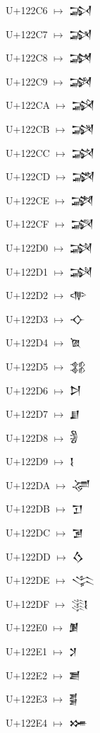 {\noindent U+122C6  $\mapsto$ {\cufont 𒋆}\par
\noindent U+122C7  $\mapsto$ {\cufont 𒋇}\par
\noindent U+122C8  $\mapsto$ {\cufont 𒋈}\par
\noindent U+122C9  $\mapsto$ {\cufont 𒋉}\par
\noindent U+122CA  $\mapsto$ {\cufont 𒋊}\par
\noindent U+122CB  $\mapsto$ {\cufont 𒋋}\par
\noindent U+122CC  $\mapsto$ {\cufont 𒋌}\par
\noindent U+122CD  $\mapsto$ {\cufont 𒋍}\par
\noindent U+122CE  $\mapsto$ {\cufont 𒋎}\par
\noindent U+122CF  $\mapsto$ {\cufont 𒋏}\par
\noindent U+122D0  $\mapsto$ {\cufont 𒋐}\par
\noindent U+122D1  $\mapsto$ {\cufont 𒋑}\par
\noindent U+122D2  $\mapsto$ {\cufont 𒋒}\par
\noindent U+122D3  $\mapsto$ {\cufont 𒋓}\par
\noindent U+122D4  $\mapsto$ {\cufont 𒋔}\par
\noindent U+122D5  $\mapsto$ {\cufont 𒋕}\par
\noindent U+122D6  $\mapsto$ {\cufont 𒋖}\par
\noindent U+122D7  $\mapsto$ {\cufont 𒋗}\par
\noindent U+122D8  $\mapsto$ {\cufont 𒋘}\par
\noindent U+122D9  $\mapsto$ {\cufont 𒋙}\par
\noindent U+122DA  $\mapsto$ {\cufont 𒋚}\par
\noindent U+122DB  $\mapsto$ {\cufont 𒋛}\par
\noindent U+122DC  $\mapsto$ {\cufont 𒋜}\par
\noindent U+122DD  $\mapsto$ {\cufont 𒋝}\par
\noindent U+122DE  $\mapsto$ {\cufont 𒋞}\par
\noindent U+122DF  $\mapsto$ {\cufont 𒋟}\par
\noindent U+122E0  $\mapsto$ {\cufont 𒋠}\par
\noindent U+122E1  $\mapsto$ {\cufont 𒋡}\par
\noindent U+122E2  $\mapsto$ {\cufont 𒋢}\par
\noindent U+122E3  $\mapsto$ {\cufont 𒋣}\par
\noindent U+122E4  $\mapsto$ {\cufont 𒋤}\par
}
